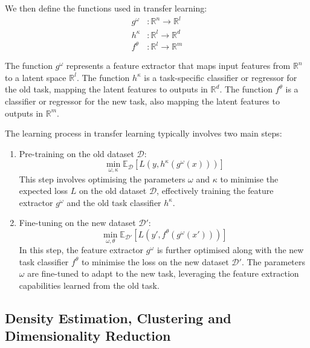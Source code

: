 We then define the functions used in transfer learning:
\begin{align}
    g^\omega &: \mathbb{R}^n \rightarrow \mathbb{R}^l \\
    h^\kappa &: \mathbb{R}^l \rightarrow \mathbb{R}^d \\ 
    f^\theta &: \mathbb{R}^l \rightarrow \mathbb{R}^m
\end{align}

The function $g^\omega$ represents a feature extractor that maps input features from $\mathbb{R}^n$ to a latent space $\mathbb{R}^l$. The function $h^\kappa$ is a task-specific classifier or regressor for the old task, mapping the latent features to outputs in $\mathbb{R}^d$. The function $f^\theta$ is a classifier or regressor for the new task, also mapping the latent features to outputs in $\mathbb{R}^m$. \bigskip

The learning process in transfer learning typically involves two main steps:

\begin{enumerate}
    \item Pre-training on the old dataset $\mathcal{D}$:
   \begin{equation}
   \min_{\omega, \kappa} \mathbb{E}_{\mathcal{D}}[L(y, h^\kappa(g^\omega(x)))]
   \end{equation}
   This step involves optimising the parameters $\omega$ and $\kappa$ to minimise the expected loss $L$ on the old dataset $\mathcal{D}$, effectively training the feature extractor $g^\omega$ and the old task classifier $h^\kappa$.

    \item Fine-tuning on the new dataset $\mathcal{D}'$:
   \begin{equation}
   \min_{\omega, \theta} \mathbb{E}_{\mathcal{D}'}[L(y', f^\theta(g^\omega(x')))]
   \end{equation}
   In this step, the feature extractor $g^\omega$ is further optimised along with the new task classifier $f^\theta$ to minimise the loss on the new dataset $\mathcal{D}'$. The parameters $\omega$ are fine-tuned to adapt to the new task, leveraging the feature extraction capabilities learned from the old task.

\end{enumerate}

\subsection{Density Estimation, Clustering and Dimensionality Reduction}

